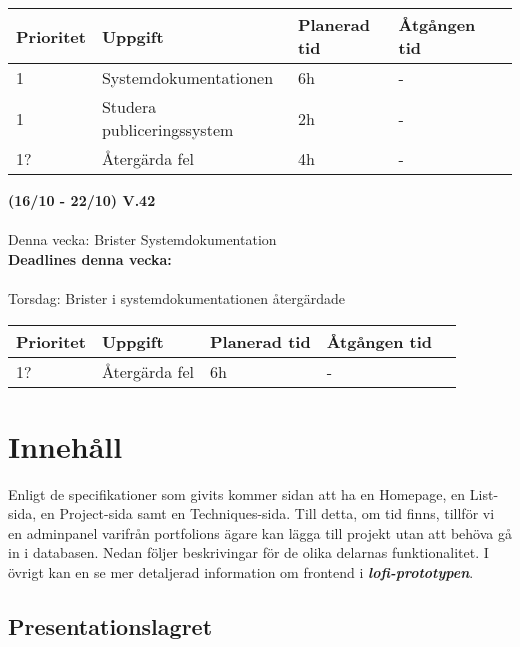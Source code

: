 \documentclass{TDP003mall}
\begin{document}
\begin{table}[]
\begin{tabular}{|l|l|l|l|l|}
\hline
 Prioritet & Uppgift                    & Planerad tid & Åtgången tid \\ \hline
 1         & Systemdokumentationen  & 6h          & -          \\ \hline
 1         & Studera publiceringssystem & 2h           & -       \\ \hline
 1?        & Återgärda fel              & 4h            & -       \\ \hline
\end{tabular}
\end{table}

\hrulefill

\textbf{(16/10 - 22/10) V.42}\\\\
Denna vecka: Brister Systemdokumentation\\

\textbf{Deadlines denna vecka: }\\\\
Torsdag: Brister i systemdokumentationen återgärdade


\begin{table}[]
\begin{tabular}{|l|l|l|l|l|}
\hline
 Prioritet & Uppgift                    & Planerad tid & Åtgången tid \\ \hline
 1?         & Återgärda fel & 6h          & -          \\ \hline

\end{tabular}
\end{table}

\hrulefill

\section{Innehåll}
Enligt de specifikationer som givits kommer sidan att ha en Homepage, en List-sida, 
en Project-sida samt en Techniques-sida. Till detta, om tid finns, tillför vi en
adminpanel varifrån portfolions ägare kan lägga till projekt utan att behöva gå in i
databasen. Nedan följer beskrivingar för de olika delarnas funktionalitet. I övrigt kan
en se mer detaljerad information om frontend i \textbf{\textit{lofi-prototypen}}.

\subsection{Presentationslagret} 
\end{document}
